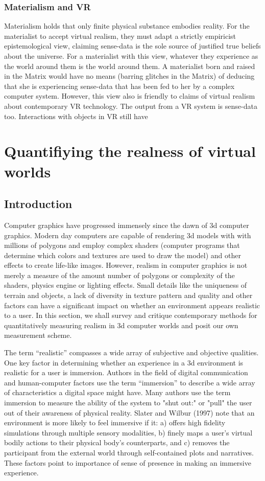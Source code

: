  \subsection{Materialism and VR}
Materialism holds that only finite physical substance embodies reality. For the materialist to accept virtual realism, they must adapt a strictly empiricist epistemological view, claiming sense-data is the sole source of justified true beliefs about the universe. For a materialist with this view, whatever they experience as the world around them is the world around them. A materialist born and raised in the Matrix would have no means (barring glitches in the Matrix) of deducing that she is experiencing sense-data that has been fed to her by a complex computer system. However, this view also is friendly to claims of virtual realism about contemporary VR technology. The output from a VR system is sense-data too. Interactions with objects in VR still have
\chapter{Quantifiying the realness of virtual worlds }\label{text}
\section{Introduction}


Computer graphics have progressed immensely since the dawn of 3d computer graphics. Modern day computers are capable of rendering 3d models with with millions of polygons and employ complex shaders (computer programs that determine which colors and textures are used to draw the model) and other effects to create life-like images. However, realism in computer graphics is not merely a measure of the amount number of polygons or complexity of the shaders, physics engine or lighting effects. Small details like the uniqueness of terrain and objects, a lack of diversity in texture pattern and quality and other factors can have a significant impact on whether an environment appears realistic to a user. In this section, we shall survey and critique contemporary methods for quantitatively measuring realism in 3d computer worlds and posit our own measurement scheme. 


The term “realistic” compasses a wide array of subjective and objective qualities. One key factor in determining whether an experience in a 3d environment is realistic for a user is immersion. Authors in the field of digital communication and human-computer factors use the term “immersion” to describe a wide array of characteristics a digital space might have. Many authors use the term immersion to measure the ability of the system to "shut out:" or "pull" the user out of their awareness of physical reality. 
Slater and Wilbur (1997) note that an environment is more likely to feel immersive if it:
a) offers high fidelity simulations
through multiple sensory modalities, b) finely maps a user’s virtual bodily
actions to their physical body’s counterparts, and c) removes the participant
from the external world through self-contained plots and narratives. 
These factors point to importance of sense of presence in making an immersive experience. 



